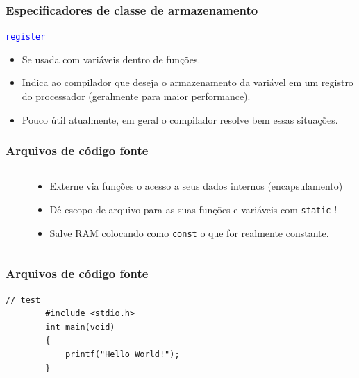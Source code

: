 \documentclass{beamer}
\begin{document}
\begin{frame}
	\frametitle{Especificadores de classe de armazenamento}
	\begin{center}
		\texttt{\textcolor{blue}{register}}
	\end{center}
	\vspace*{0.5cm}
	\begin{itemize}
		\item Se usada com variáveis dentro de funções.
		\item Indica ao compilador que deseja o armazenamento da variável em um registro do processador (geralmente para maior performance).
		\item Pouco útil atualmente, em geral o compilador resolve bem essas situações.
	\end{itemize}
\end{frame}

\begin{frame}
	\frametitle{Arquivos de código fonte}
	\begin{columns}[T] %
		\begin{column}{.60\textwidth}
			
		\end{column}%
		\hfill%
		\begin{column}{.40\textwidth}
			\begin{itemize}
				\item Externe via funções o acesso a seus dados internos (encapsulamento)
				\item Dê escopo de arquivo para as suas funções e variáveis com \texttt{static} !
				\item Salve RAM colocando como \texttt{const} o que for realmente constante.
			\end{itemize}
		\end{column}%
	\end{columns}
\end{frame}

\begin{frame}
	\frametitle{Arquivos de código fonte}
	
\end{frame}


\begin{frame}[fragile]
	\begin{lstlisting}[style=customc]
		// test
		#include <stdio.h>
		int main(void)
		{
			printf("Hello World!");
		}
	\end{lstlisting}
\end{frame}
\end{document}
